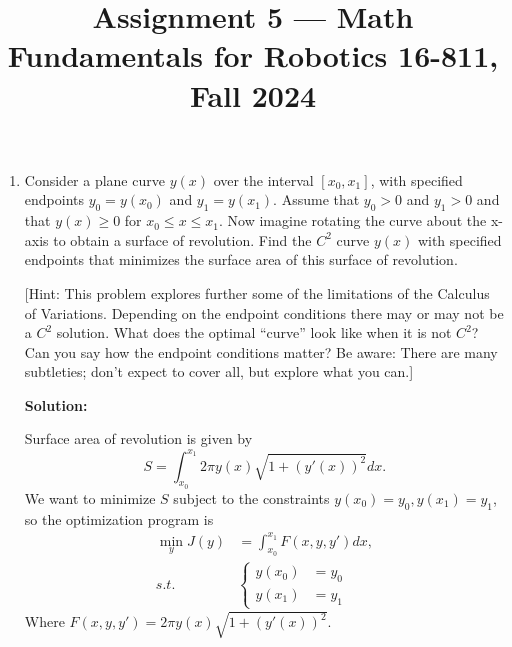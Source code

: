 \documentclass[conference,onecolumn]{IEEEtran}
\begin{document}
\title{\Large Assignment 5 --- Math Fundamentals for Robotics 16-811, Fall 2024}

\author{
}

\maketitle

\begin{enumerate}
      \item Consider a plane curve $y(x)$ over the interval $[x_0, x_1]$, with specified endpoints $y_0 = y(x_0)$ and $y_1 = y(x_1)$.
            Assume that $y_0 > 0$ and $y_1 > 0$ and that $y(x) \geq 0$ for $x_0 \leq x \leq x_1$.
            Now imagine rotating the curve about the x-axis to obtain a surface of revolution.
            Find the $C^2$ curve $y(x)$ with specified endpoints that minimizes the surface area of this surface of revolution.

                  [Hint: This problem explores further some of the limitations of the Calculus of Variations.
                        Depending on the endpoint conditions there may or may not be a $C^2$ solution.
                        What does the optimal “curve” look like when it is not $C^2$?
                        Can you say how the endpoint conditions matter?
                        Be aware: There are many subtleties; don't expect to cover all, but explore what you can.]

            \textbf{Solution:}

            Surface area of revolution is given by
            $$
                  S = \int_{x_0}^{x_1} 2\pi y(x) \sqrt{1 + (y'(x))^2} dx.
            $$
            We want to minimize $S$ subject to the constraints $y(x_0) = y_0, y(x_1) = y_1$, so the optimization program is
            \begin{align*}
                  \min_y J(y) & = \int_{x_0}^{x_1} F(x, y, y') dx, \\
                  s.t.        & \begin{cases}
                        y(x_0) & = y_0 \\
                        y(x_1) & = y_1
                  \end{cases}
            \end{align*}
            Where $F(x, y, y') = 2\pi y(x) \sqrt{1 + (y'(x))^2}$.


\end{enumerate}
\end{document}
